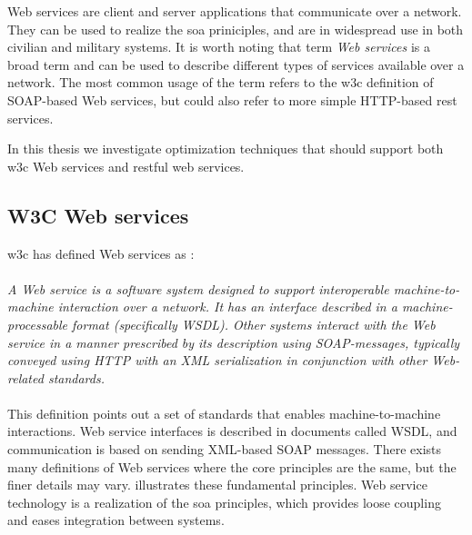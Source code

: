 Web services are client and server applications that communicate over a network.
They can be used to realize the \gls{soa} priniciples, and are in widespread use
in both civilian and military systems. It is worth noting that term \textit{Web
services} is a broad term and can be used to describe different types of
services available over a network. The most common usage of the term refers to
the \gls{w3c} definition of SOAP-based Web services, but could also refer to
more simple HTTP-based \gls{rest} services.

In this thesis we investigate optimization techniques that should support both
\gls{w3c} Web services and \gls{rest}ful web services.

\subsection{W3C Web services}

\gls{w3c} has defined Web services as \cite{wrc-web-service}:

\paragraph{}
\textit{
    A Web service is a software system designed to support interoperable
    machine-to-machine interaction over a network. It has an interface described in
    a machine-processable format (specifically WSDL). Other systems interact with
    the Web service in a manner prescribed by its description using SOAP-messages,
    typically conveyed using HTTP with an XML serialization in conjunction with
    other Web-related standards.
}

\paragraph{}

This definition points out a set of standards that enables machine-to-machine
interactions. Web service interfaces is described in documents called WSDL, and
communication is based on sending XML-based SOAP messages. There exists many
definitions of Web services where the core principles are the same, but the
finer details may vary.  illustrates these
fundamental principles. Web service technology is a realization of the \gls{soa}
principles, which provides loose coupling and eases integration between systems.

